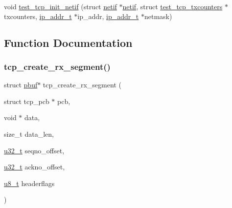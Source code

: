 \begin{DoxyCompactItemize}
\item 
void \hyperlink{openmote-cc2538_2lwip_2test_2unit_2tcp_2tcp__helper_8h_adce5a273dd4854e4d2b6282265e9fdb7}{test\+\_\+tcp\+\_\+init\+\_\+netif} (struct \hyperlink{structnetif}{netif} $\ast$\hyperlink{structnetif}{netif}, struct \hyperlink{structtest__tcp__txcounters}{test\+\_\+tcp\+\_\+txcounters} $\ast$txcounters, \hyperlink{native_2lwip_2src_2include_2lwip_2ip__addr_8h_a88b43639738c4de2d3cd22e3a1fd7696}{ip\+\_\+addr\+\_\+t} $\ast$ip\+\_\+addr, \hyperlink{native_2lwip_2src_2include_2lwip_2ip__addr_8h_a88b43639738c4de2d3cd22e3a1fd7696}{ip\+\_\+addr\+\_\+t} $\ast$netmask)
\end{DoxyCompactItemize}


\subsection{Function Documentation}
\mbox{\label{openmote-cc2538_2lwip_2test_2unit_2tcp_2tcp__helper_8h_a53b3207c8e960cdad9af044b0606a55b}} 
\subsubsection{\texorpdfstring{tcp\+\_\+create\+\_\+rx\+\_\+segment()}{tcp\_create\_rx\_segment()}}
{\footnotesize\ttfamily struct \hyperlink{structpbuf}{pbuf}$\ast$ tcp\+\_\+create\+\_\+rx\+\_\+segment (\begin{DoxyParamCaption}\item[{struct tcp\+\_\+pcb $\ast$}]{pcb,  }\item[{void $\ast$}]{data,  }\item[{size\+\_\+t}]{data\+\_\+len,  }\item[{\hyperlink{group__compiler__abstraction_ga4c14294869aceba3ef9d4c0c302d0f33}{u32\+\_\+t}}]{seqno\+\_\+offset,  }\item[{\hyperlink{group__compiler__abstraction_ga4c14294869aceba3ef9d4c0c302d0f33}{u32\+\_\+t}}]{ackno\+\_\+offset,  }\item[{\hyperlink{group__compiler__abstraction_ga4caecabca98b43919dd11be1c0d4cd8e}{u8\+\_\+t}}]{headerflags }\end{DoxyParamCaption})}

